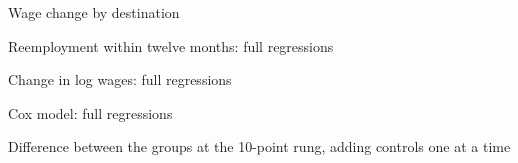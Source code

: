 \documentclass[11pt,a4paper]{article}
\begin{document}
\begin{table}[!htb]
\centering
\caption{Wage change by destination}
\label{tab:saldestino}

\end{table}

\begin{table}[!htb]
\centering
\caption{Reemployment within twelve months: full regressions}
\label{tab:reg12}

\end{table}

\begin{table}[!htb]
\centering
\caption{Change in log wages: full regressions}
\label{tab:regsal}

\end{table}

\begin{table}[!htb]
\centering
\caption{Cox model: full regressions}
\label{tab:regcox}

\end{table}

\begin{table}[!htb]
\centering
\caption{Difference between the groups at the 10-point rung, adding controls one at a time}
\label{tab:escadadecomp}

\end{table}
\end{document}
